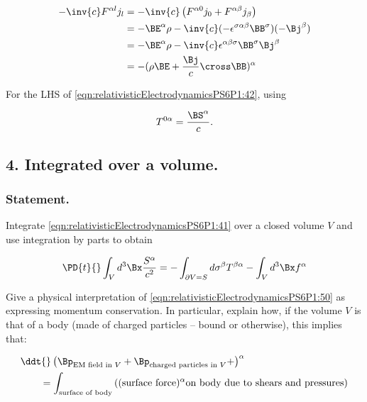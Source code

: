 \begin{align*}
-\inv{c} F^{\alpha l} j_l
&=
-\inv{c} 
\left( 
F^{\alpha 0} j_0 
+F^{\alpha \beta} j_\beta 
\right) \\
&= 
- \BE^\alpha \rho - \inv{c} (- \epsilon^{\sigma \alpha \beta} \BB^\sigma) (-\Bj^\beta) \\
&= 
- \BE^\alpha \rho - \inv{c} \epsilon^{\alpha \beta \sigma} \BB^\sigma \Bj^\beta \\
&= 
- (\rho \BE + \frac{\Bj}{c} \cross \BB)^\alpha
\end{align*}

For the LHS of \ref{eqn:relativisticElectrodynamicsPS6P1:42}, using

\begin{equation}\label{eqn:relativisticElectrodynamicsPS6P1:200}
T^{0 \alpha} = \frac{\BS^\alpha}{c}.
\end{equation}


\subsection{4. Integrated over a volume.}

\subsubsection{Statement.}

Integrate \ref{eqn:relativisticElectrodynamicsPS6P1:41} over a closed volume $V$ and use integration by parts to obtain

\begin{equation}\label{eqn:relativisticElectrodynamicsPS6P1:50}
\PD{t}{} \int_V d^3 \Bx \frac{S^\alpha}{c^2} 
= 
- \int_{\partial V = S} d \sigma^\beta T^{\beta \alpha} - \int_V d^3 \Bx f^\alpha 
\end{equation}

Give a physical interpretation of \ref{eqn:relativisticElectrodynamicsPS6P1:50} as expressing momentum conservation.  In particular, explain how, if the volume $V$ is that of a body (made of charged particles -- bound or otherwise), this implies that:

\begin{equation}\label{eqn:relativisticElectrodynamicsPS6P1:60}
\begin{aligned}
&\ddt{} \left( 
\Bp_{\text{EM field in $V$}} + 
\Bp_{\text{charged particles in $V$}} + 
\right)^\alpha \\
&\qquad = \int_{\text{surface of body}} \left( 
(\text{surface force})^\alpha \text{on body due to shears and pressures}
\right)
\end{aligned}
\end{equation}

